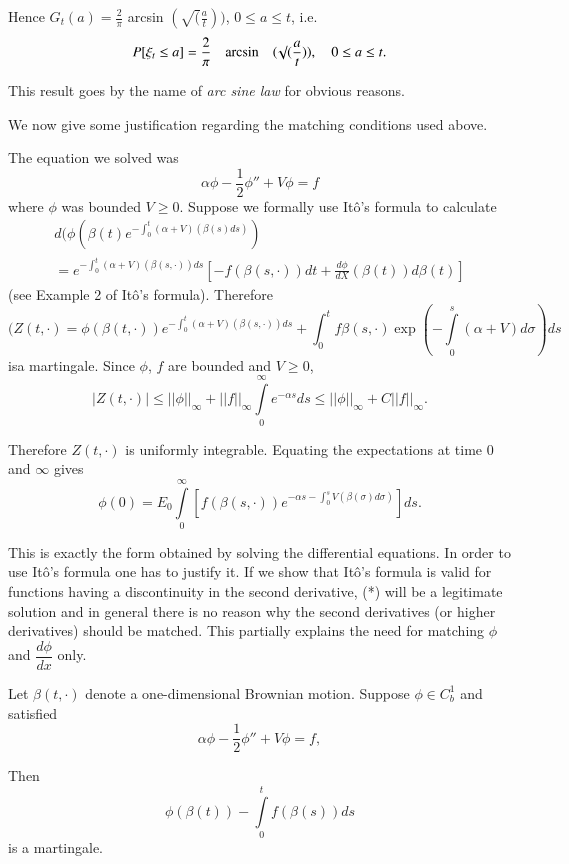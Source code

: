Hence $G_{t}(a)=\frac{2}{\pi}$ arcsin $(\surd(\frac{a}{t}))$, $0\leq
a\leq t$, i.e.
$$
P[\xi_{t}\leq a]=\frac{2}{\pi}\quad\text{arcsin}\quad(\surd(\frac{a}{t})),\quad
0\leq a\leq t.
$$

This result goes by the name of {\em arc sine law} for obvious
reasons.

We now give some justification regarding the matching conditions used
above.

The equation we solved was
$$
\alpha\phi-\frac{1}{2}\phi''+V\phi=f
$$
where $\phi$ was bounded $V\geq 0$. Suppose we formally use It\^o's
formula to calculate
\begin{gather*}
d\Big(\phi(\beta(t)e^{-\int^{t}_{0}(\alpha+V)(\beta(s)ds)})\\
=e^{-\int^{t}_{0}(\alpha+V)(\beta(s,\cdot))ds}[-f(\beta(s,\cdot))dt+\frac{d\phi}{dX}(\beta(t))d\beta(t)]
\end{gather*}
(see Example 2 of It\^o's formula). Therefore
$$
(Z(t,\cdot)=\phi(\beta(t,\cdot))e^{-\int^{t}_{0}(\alpha+V)(\beta(s,\cdot))ds}+\int^{t}_{0}f\beta(s,\cdot)\exp(-\int\limits^{s}_{0}(\alpha+V)d\sigma)ds
$$
is\pageoriginale a martingale. Since $\phi$, $f$ are bounded and
$V\geq 0$,
$$
|Z(t,\cdot)|\leq
||\phi||_{\infty}+||f||_{\infty}\int\limits^{\infty}_{0}e^{-\alpha
  s}ds\leq ||\phi||_{\infty}+C||f||_{\infty}.
$$

Therefore $Z(t,\cdot)$ is uniformly integrable. Equating the
expectations at time $0$ and $\infty$ gives
\begin{equation*}
\phi(0)=E_{0}\int\limits^{\infty}_{0}[f(\beta(s,\cdot))e^{-\alpha s-\int^{s}_{0}V(\beta(\sigma)d\sigma)}]ds.\tag{*}
\end{equation*}

This is exactly the form obtained by solving the differential
equa\-tions. In order to use It\^o's formula one has to justify it. If
we show that It\^o's formula is valid for functions having a
discontinuity in the second derivative, (*) will be a legitimate
solution and in general there is no reason why the second derivatives
(or higher derivatives) should be matched. This partially explains the
need for matching $\phi$ and $\dfrac{d\phi}{dx}$ only.

\begin{prop*}
Let $\beta(t,\cdot)$ denote a one-dimensional Brownian motion. Suppose
$\phi \in C^{1}_{b}$ and satisfied
$$
\alpha\phi-\frac{1}{2}\phi''+V\phi=f,
$$

Then 
$$
\phi(\beta(t))-\int\limits^{t}_{0}f(\beta(s))ds
$$
is a martingale.
\end{prop*}

